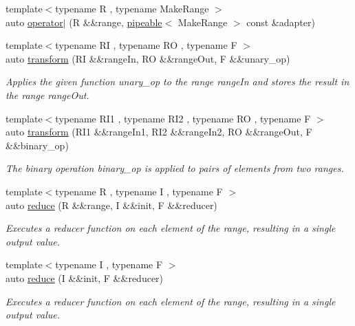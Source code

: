 \begin{DoxyCompactItemize}
{\footnotesize template$<$typename R , typename Make\+Range $>$ }\\auto \mbox{\hyperlink{namespacerah_a5c6923b0ef49c831571590f953253ff9}{operator$\vert$}} (R \&\&range, \mbox{\hyperlink{structrah_1_1pipeable}{pipeable}}$<$ Make\+Range $>$ const \&adapter)
\item 
{\footnotesize template$<$typename RI , typename RO , typename F $>$ }\\auto \mbox{\hyperlink{namespacerah_a7cb27bf7219a7ee4b47cc9da217810a8}{transform}} (RI \&\&range\+In, RO \&\&range\+Out, F \&\&unary\+\_\+op)
\begin{DoxyCompactList}\small\item\em Applies the given function unary\+\_\+op to the range range\+In and stores the result in the range range\+Out. \end{DoxyCompactList}\item 
{\footnotesize template$<$typename R\+I1 , typename R\+I2 , typename RO , typename F $>$ }\\auto \mbox{\hyperlink{namespacerah_a7bac191e66e0d3f3823e0c08382f0418}{transform}} (R\+I1 \&\&range\+In1, R\+I2 \&\&range\+In2, RO \&\&range\+Out, F \&\&binary\+\_\+op)
\begin{DoxyCompactList}\small\item\em The binary operation binary\+\_\+op is applied to pairs of elements from two ranges. \end{DoxyCompactList}\item 
{\footnotesize template$<$typename R , typename I , typename F $>$ }\\auto \mbox{\hyperlink{namespacerah_a407b50a4f029e3f2a3cd0ba9142aea84}{reduce}} (R \&\&range, I \&\&init, F \&\&reducer)
\begin{DoxyCompactList}\small\item\em Executes a reducer function on each element of the range, resulting in a single output value. \end{DoxyCompactList}\item 
{\footnotesize template$<$typename I , typename F $>$ }\\auto \mbox{\hyperlink{namespacerah_a6a6b7b7e3b78bb4bd16372fbb688c152}{reduce}} (I \&\&init, F \&\&reducer)
\begin{DoxyCompactList}\small\item\em Executes a reducer function on each element of the range, resulting in a single output value. \end{DoxyCompactList}\item 

\end{DoxyCompactItemize}
